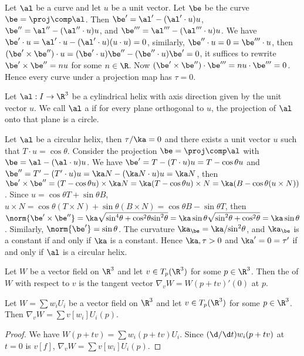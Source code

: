 \documentclass[10pt]{article}
\begin{document}
Let $\al$ be a curve and let $u$ be a unit vector. Let $\be$ be the curve $\be=\proj\comp\al$. Then $\be'=\al'-(\al'\cdot u)u$, $\be''=\al''-(\al''\cdot u)u$, and $\be'''=\al'''-(\al'''\cdot u)u$. We have $\be'\cdot u=\al'\cdot u-(\al'\cdot u)(u\cdot u)=0$, similarly, $\be''\cdot u=0=\be'''\cdot u$, then $(\be'\times\be'')\cdot u=(\be'\cdot u)\be''-(\be''\cdot u)\be'=0$, it suffices to rewrite $\be'\times\be''=nu$ for some $n\in\R$. Now $(\be'\times\be'')\cdot\be'''=nu\cdot\be'''=0$. Hence every curve under a projection map has $\tau=0$.
\begin{definition}
    Let $\al:I\to{\R}^{3}$ be a cylindrical helix with axis direction given by the unit vector $u$. We call $\al$ a  if for every plane orthogonal to $u$, the projection of $\al$ onto that plane is a circle.
\end{definition}
\par
Let $\al$ be a circular helix, then $\tau/\ka=0$ and there exists a unit vector $u$ such that $T\cdot u=\cos\theta$. Consider the projection $\be=\proj\comp\al$ with $\be=\al-(\al\cdot u)u$. We have $\be'=T-(T\cdot u)u=T-\cos\theta u$ and $\be''=T'-(T'\cdot u)u=\ka N-(\ka N\cdot u)u=\ka N$, then $\be'\times\be''=(T-\cos\theta u)\times\ka N=\ka(T-\cos\theta u)\times N=\ka(B-\cos\theta(u\times N))$. Since $u=\cos\theta T+\sin\theta B$, $u\times N=\cos\theta(T\times N)+\sin\theta(B\times N)=\cos\theta B-\sin\theta T$, then $\norm{\be'\times\be''}=\ka\sqrt{{\sin}^{4}\theta+{\cos}^{2}\theta{\sin}^{2}\theta}=\ka\sin\theta\sqrt{{\sin}^{2}\theta+{\cos}^{2}\theta}=\ka\sin\theta$. Similarly, $\norm{\be'}=\sin\theta$. The curvature ${\ka}_{\be}=\ka/{\sin}^{2}\theta$, and ${\ka}_{\be}$ is a constant if and only if $\ka$ is a constant. Hence $\ka,\tau>0$ and $\ka'=0=\tau'$ if and only if $\al$ is a circular helix.
\begin{definition}
    Let $W$ be a vector field on ${\R}^{3}$ and let $v\in{T}_{p}({\R}^{3})$ for some $p\in{\R}^{3}$. Then the  of $W$ with respect to $v$ is the tangent vector ${\nabla}_{v}W=W(p+tv)'(0)$ at $p$.
\end{definition}
\begin{proposition}
    Let $W=\sum{w}_{i}{U}_{i}$ be a vector field on ${\R}^{3}$ and let $v\in{T}_{p}({\R}^{3})$ for some $p\in{\R}^{3}$. Then ${\nabla}_{v}W=\sum v[{w}_{i}]{U}_{i}(p)$.
\end{proposition}
\begin{proof}
    We have $W(p+tv)=\sum{w}_{i}(p+tv){U}_{i}$. Since $(\d/\d t){w}_{i}(p+tv)$ at $t=0$ is $v[f]$, ${\nabla}_{v}W=\sum v[{w}_{i}]{U}_{i}(p)$.
\end{proof}
\end{document}
